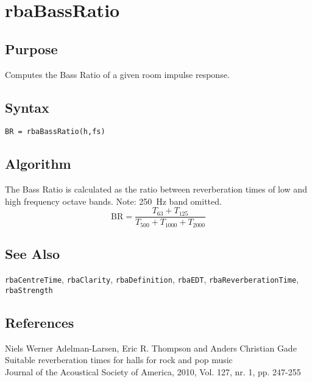 
\chapter{rbaBassRatio} %
\label{cha:rbaBassRatio} %

\section{Purpose} %
\label{sec:rbaBassRatio_purpose}

Computes the Bass Ratio of a given room impulse response.

\section{Syntax} %
\label{sec:rbaBassRatio_syntax}


\texttt{BR = rbaBassRatio(h,fs)}


\section{Algorithm} %
\label{sec:rbaBassRatio_algorithm}

The Bass Ratio is calculated as the ratio between reverberation times of low and high frequency octave bands. Note: 250~Hz band omitted. 
\begin{equation}
	\text{BR} = \frac{T_{63}+T_{125}}{T_{500}+T_{1000}+T_{2000}}
\end{equation}

\section{See Also} %
\label{sec:rbaBassRatio_see_also}


\texttt{rbaCentreTime}, \texttt{rbaClarity}, \texttt{rbaDefinition}, \texttt{rbaEDT}, \texttt{rbaReverberationTime}, \texttt{rbaStrength}


\section{References} %
\label{sec:rbaBassRatio_references}

Niels Werner Adelman-Larsen, Eric R. Thompson and Anders Christian Gade
Suitable reverberation times for halls for rock and pop music\\
Journal of the Acoustical Society of America, 2010, Vol. 127, nr. 1, pp. 247-255



